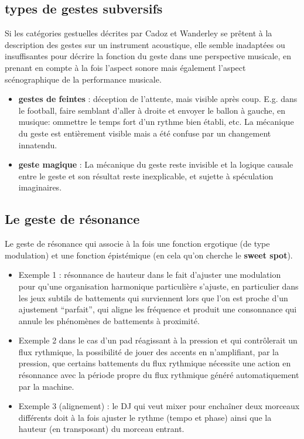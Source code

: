 \subsection*{types de gestes subversifs}

Si les catégories gestuelles décrites par Cadoz et Wanderley se prêtent à la description des gestes sur un instrument acoustique, elle semble inadaptées ou insuffisantes pour décrire la fonction du geste dans une perspective musicale, en prenant en compte à la fois l'aspect sonore mais également l'aspect scénographique de la performance musicale.

\vspace{-1em}
\begin{itemize}[noitemsep]
\item \textbf{gestes de feintes} : déception de l'attente, mais visible après coup. E.g. dans le football, faire semblant d'aller à droite et envoyer le ballon à gauche, en musique: ommettre le temps fort d'un rythme bien établi, etc. La mécanique du geste est entièrement visible mais a été confuse par un changement innatendu.
\item \textbf{geste magique} : La mécanique du geste reste invisible et la logique causale entre le geste et son résultat reste inexplicable, et sujette à spéculation imaginaires.
\end{itemize}


\subsection*{Le geste de résonance}

Le geste de résonance qui associe à la fois une fonction ergotique (de type modulation) et une fonction épistémique (en cela qu'on cherche le \textbf{sweet spot}). 
\vspace{-1em}
\begin{itemize}[noitemsep]
\item Exemple 1 : résonnance de hauteur dans le fait d'ajuster une modulation pour qu'une organisation harmonique particulière s'ajuste, en particulier dans les jeux subtils de battements qui surviennent lors que l'on est proche d'un ajustement ``parfait'', qui aligne les fréquence et produit une consonnance qui annule les phénomènes de battements à proximité.
\item Exemple 2 dans le cas d'un pad réagissant à la pression et qui contrôlerait un flux rythmique, la possibilité de jouer des accents en n'amplifiant, par la pression, que certains battements du flux rythmique nécessite une action en résonnance avec la période propre du flux rythmique généré automatiquement par la machine.
\item Exemple 3 (alignement) : le DJ qui veut mixer pour enchaîner deux morceaux différents doit à la fois ajuster le rythme (tempo et phase) ainsi que la hauteur (en transposant) du morceau entrant.
\end{itemize}

